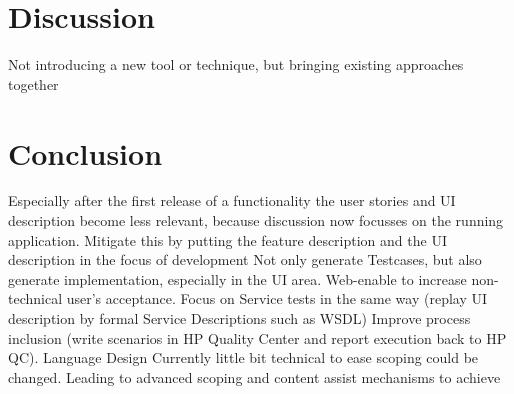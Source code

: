\documentclass{sig-alternate-05-2015}
\begin{document}
\section{Discussion}\label{sec:Discussion}
Not introducing a new tool or technique, but bringing existing approaches together

\section{Conclusion}\label{sec:Conclusion} %
Especially after the first release of a functionality the user stories and UI description become less relevant, because discussion now focusses on the running application. Mitigate this by putting the feature description and the UI description in the focus of development 
Not only generate Testcases, but also generate implementation, especially in the UI area.
Web-enable to increase non-technical user’s acceptance. 
Focus on Service tests in the same way (replay UI description by formal Service Descriptions such as WSDL)
Improve process inclusion (write scenarios in HP Quality Center and report execution back to HP QC). 
Language Design Currently little bit technical to ease scoping could be changed. Leading to advanced scoping and content assist mechanisms to achieve 


%



%
%

\end{document}
